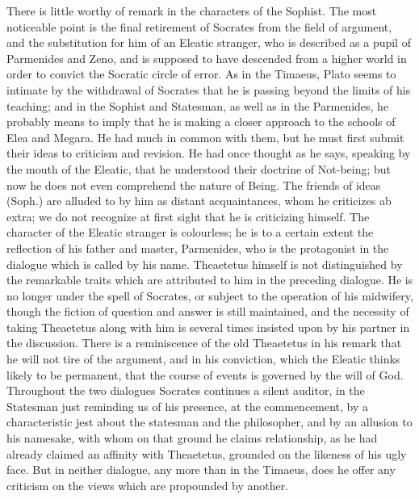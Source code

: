 \documentclass[11pt,letter]{article}
\begin{document}
\par  There is little worthy of remark in the characters of the Sophist. The most noticeable point is the final retirement of Socrates from the field of argument, and the substitution for him of an Eleatic stranger, who is described as a pupil of Parmenides and Zeno, and is supposed to have descended from a higher world in order to convict the Socratic circle of error. As in the Timaeus, Plato seems to intimate by the withdrawal of Socrates that he is passing beyond the limits of his teaching; and in the Sophist and Statesman, as well as in the Parmenides, he probably means to imply that he is making a closer approach to the schools of Elea and Megara. He had much in common with them, but he must first submit their ideas to criticism and revision. He had once thought as he says, speaking by the mouth of the Eleatic, that he understood their doctrine of Not-being; but now he does not even comprehend the nature of Being. The friends of ideas (Soph.) are alluded to by him as distant acquaintances, whom he criticizes ab extra; we do not recognize at first sight that he is criticizing himself. The character of the Eleatic stranger is colourless; he is to a certain extent the reflection of his father and master, Parmenides, who is the protagonist in the dialogue which is called by his name. Theaetetus himself is not distinguished by the remarkable traits which are attributed to him in the preceding dialogue. He is no longer under the spell of Socrates, or subject to the operation of his midwifery, though the fiction of question and answer is still maintained, and the necessity of taking Theaetetus along with him is several times insisted upon by his partner in the discussion. There is a reminiscence of the old Theaetetus in his remark that he will not tire of the argument, and in his conviction, which the Eleatic thinks likely to be permanent, that the course of events is governed by the will of God. Throughout the two dialogues Socrates continues a silent auditor, in the Statesman just reminding us of his presence, at the commencement, by a characteristic jest about the statesman and the philosopher, and by an allusion to his namesake, with whom on that ground he claims relationship, as he had already claimed an affinity with Theaetetus, grounded on the likeness of his ugly face. But in neither dialogue, any more than in the Timaeus, does he offer any criticism on the views which are propounded by another.
\end{document}
